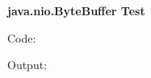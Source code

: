 \documentclass[UTF8]{article}
\begin{document}
 
\centerline{\bf {\ttfamily java.nio.ByteBuffer Test}}
Code:

Output:

\end{document}
